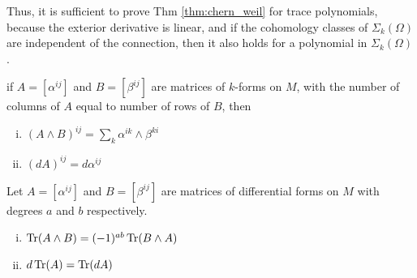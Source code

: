 Thus, it is sufficient to prove Thm \ref{thm:chern_weil} for trace polynomials,
because the exterior derivative is linear, and if the cohomology classes of
$\Sigma_k(\Omega)$ are independent of the connection, then it also holds for a
polynomial in $\Sigma_k(\Omega)$.

\begin{defn}
	if $A = [\alpha^{ij}]$ and $B = [\beta^{ij}]$ are matrices of $k$-forms on
	 $M$, with the number of columns of  $A$ equal to number of rows of  $B$,
	 then 
	  \begin{enumerate}[(i)]
	     \item $(A\wedge B)^{ij} = \sum_k \alpha ^{ik} \wedge\beta^{ki} $
	     \item $(dA)^{ij} = d\alpha ^{ij}$
	 \end{enumerate}
\end{defn}
\begin{prop}
	Let $A = [\alpha^{ij}]$ and $B = [\beta^{ij}]$ are matrices of differential
	forms on $M$ with degrees $a$ and  $b$ respectively.
	\begin{enumerate}[(i)]
	    \item $\operatorname{Tr}(A\wedge B) = (-1)^{ab} \operatorname{Tr}(B\wedge A)$
		\item $d \operatorname{Tr}(A) = \operatorname{Tr}(dA)$
	\end{enumerate}
\end{prop}


